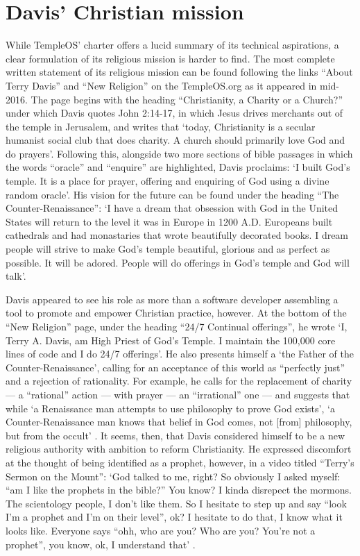 \documentclass[Draft.tex]{subfiles}
\begin{document}
\section*{Davis' Christian mission}
While TempleOS' charter offers a lucid summary of its technical aspirations,
a clear formulation of its religious mission is harder to find.
The most complete written statement of its religious mission can be found
following the links ``About Terry Davis'' and ``New Religion'' on the
TempleOS.org as it appeared in mid-2016.
The page begins with the heading ``Christianity, a Charity or a Church?''
under which Davis \parencite*{NewReligionSite} quotes John 2:14-17, in which
Jesus drives merchants out of the temple in Jerusalem,
and writes that `today, Christianity is a secular humanist social club
that does charity.  A church should primarily love God and do prayers'.
Following this, alongside two more sections of bible passages in which
the words ``oracle'' and ``enquire'' are highlighted,
Davis proclaims: `I built God's temple.  It is a place for prayer, offering and
enquiring of God using a divine random oracle'.
His vision for the future can be found under the heading
``The Counter-Renaissance'':
`I have a dream that obsession with God in the United States
will return to the level it was in Europe in 1200 A.D.
Europeans built cathedrals and had monastaries
that wrote beautifully decorated books.
I dream people will strive to make God's temple beautiful, glorious
and as perfect as possible.  It will be adored.
People will do offerings in God's temple and God will talk'.

Davis appeared to see his role as more than a software developer
assembling a tool to promote and empower Christian practice, however.
At the bottom of the ``New Religion'' page,
under the heading ``24/7 Continual offerings'',
he wrote `I, Terry A. Davis, am High Priest of God's Temple.
I maintain the 100,000 core lines of code and I do 24/7 offerings'.
He also presents himself a `the Father of the Counter-Renaissance',
calling for an acceptance of this world as ``perfectly just''
and a rejection of rationality.
For example, he calls for the replacement of charity
--- a ``rational'' action ---
with prayer --- an ``irrational'' one ---
and suggests that while `a Renaissance man
attempts to use philosophy to prove God exists',
`a Counter-Renaissance man knows that belief in God comes,
not [from] philosophy, but from the occult'
\parencite{CounterRenaissance}.
It seems, then, that Davis considered himself to be
a new religious authority with ambition to reform Christianity.
He expressed discomfort at the thought of being identified as a prophet,
however, in a video titled ``Terry's Sermon on the Mount'':
`God talked to me, right?
So obviously I asked myself: ``am I like the prophets in the bible?''
You know? I kinda disrepect the mormons.
The scientology people, I don't like them.
So I hesitate to step up and say ``look I'm a prophet and I'm on their level'',
ok? I hesitate to do that, I know what it looks like.
Everyone says ``ohh, who are you? Who are you? You're not a prophet'',
you know, ok, I understand that' \parencite{SermonMount}.
\end{document}
